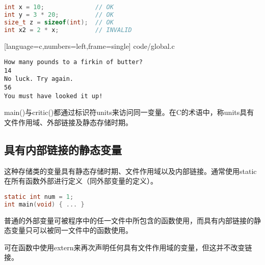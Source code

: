 \begin{frame}[fragile]
\begin{lstlisting}[language=c,frame=single]
int x = 10;              // OK
int y = 3 * 20;          // OK
size_t z = sizeof(int);  // OK
int x2 = 2 * x;          // INVALID
\end{lstlisting}
\end{frame}

\begin{frame}
  
  [language=c,numbers=left,frame=single]
  {code/global.c}
\end{frame}

\begin{frame}
\begin{lstlisting}[backgroundcolor=\color{red!20}]
How many pounds to a firkin of butter?
14
No luck. Try again.
56
You must have looked it up!
\end{lstlisting}
\end{frame}

\begin{frame}[fragile]
  {\tf main()}与{\tf critic()}都通过标识符{\tf units}来访问同一变量。在C的术语中，称{\tf units}具有文件作用域、外部链接及静态存储时期。
\end{frame}
  
\subsection{具有内部链接的静态变量}
\begin{frame}[fragile]\ft{\subsecname}
  这种存储类的变量具有静态存储时期、文件作用域以及内部链接。通常使用{\tf static}在所有函数外部进行定义（同外部变量的定义）。
  \begin{lstlisting}[language=c,frame=single]
static int num = 1;
int main(void) { ... }    
\end{lstlisting}
\end{frame}
 
 \begin{frame}[fragile]\ft{\subsecname}
   普通的外部变量可被程序中的任一文件中所包含的函数使用，而具有内部链接的静态变量只可以被同一文件中的函数使用。
\end{frame}
 
 \begin{frame}[fragile]\ft{\subsecname}
   可在函数中使用{\tf extern}来再次声明任何具有文件作用域的变量，但这并不改变链接。
\end{frame}
 
